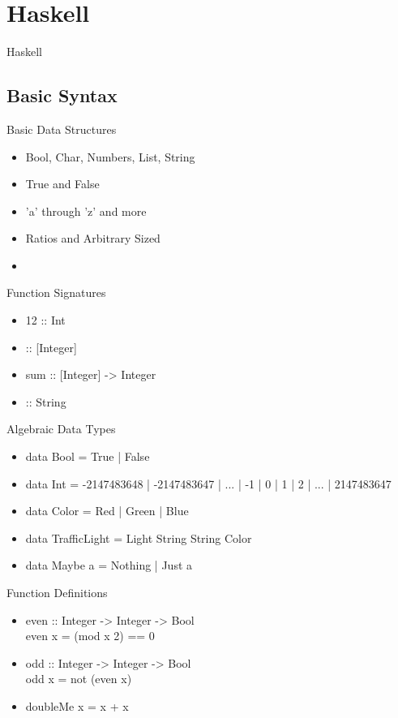 \documentclass{beamer}                  %
\newcommand{\srule}{
	\rule{\textwidth}{1pt}\\
}
\newlength{\subsecwidth}
\newenvironment{slide}{
	\begin{frame} %
	\settowidth{\subsecwidth}{\insertsubsection} %
	\ifthenelse{\dimtest{\subsecwidth}{<}{1pt}}{ %
		\frametitle{\insertsection\\             %
		\vspace{-1ex}                            %
		\color{fore}\srule                       %
		\par                                     %
		\vspace{-3ex}                            %
		}
	}{                                           %
		\frametitle{\insertsection\ -- \insertsubsection\\ %
		\vspace{-1ex}                            %
		\color{fore}\srule                       %
		\par                                     %
		\vspace{-3ex}                            %
		}
	}
	\Large                                       %
}{
	\end{frame}
}
\newcommand{\titleslide}[1]{
	\section{#1}             %
	\begin{slide}
		\begin{center}
			\color{comments}
			\Huge            %
			#1               %
		\end{center}
	\end{slide}
}
\begin{document}
\titleslide{Haskell}

\subsection{Basic Syntax}

\begin{slide}
  Basic Data Structures
  \begin{itemize}
    \item Bool, Char, Numbers, List, String
    \item True and False
    \item 'a' through 'z' and more
    \item Ratios and Arbitrary Sized
    \item \code [1, 2, 3]
  \end{itemize}
\end{slide}

\begin{slide}
  Function Signatures
  \begin{itemize}
    \item 12 :: Int
    \item \code [1, 2, 3] :: [Integer]
    \item sum :: [Integer] -> Integer
    \item \code ['f', 'o', 'o'] :: String
  \end{itemize}
\end{slide}

\begin{slide}
  Algebraic Data Types
  \begin{itemize}
    \item data Bool = True | False
    \item data Int = -2147483648 | -2147483647 | ... | -1 | 0 | 1 | 2 | ... | 2147483647
    \item data Color = Red | Green | Blue
    \item data TrafficLight = Light String String Color
    \item data Maybe a = Nothing | Just a
  \end{itemize}
\end{slide}

\begin{slide}
  Function Definitions
  \begin{itemize}
    \item
      \code
      even :: Integer -> Integer -> Bool\\
      even x = (mod x 2) == 0
    \item
      odd :: Integer -> Integer -> Bool\\
      odd x = not (even x)
    \item
      doubleMe x = x + x
  \end{itemize}
\end{slide}
\end{document}
